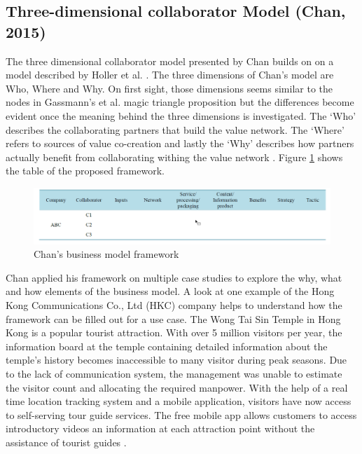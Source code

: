	\subsection{Three-dimensional collaborator Model (Chan, 2015)}

	The three dimensional collaborator model presented by Chan \cite{chan} builds on on a model described by Holler et al. \cite{holler}. The three dimensions of Chan's model are Who, Where and Why. On first sight, those dimensions seems similar to the nodes in Gassmann's et al. magic triangle proposition but the differences become evident once the meaning behind the three dimensions is investigated. The `Who' describes the collaborating partners that build the value network. The `Where' refers to sources of value co-creation and lastly the `Why' describes how partners actually benefit from collaborating withing the value network \cite{chan}. Figure \ref{Chan framework} shows the table of the proposed framework.

			\begin{figure}[ht]
			    \begin{center}
			    \includegraphics[scale=0.5]{Talk11/chan.png}
			    \end{center}
			    \caption{Chan's business model framework}
			    \label{Chan framework}
			\end{figure}

	Chan applied his framework on multiple case studies to explore the why, what and how elements of the business model. A look at one example of the Hong Kong Communications Co., Ltd (HKC) company helps to understand how the framework can be filled out for a use case. The Wong Tai Sin Temple in Hong Kong is a popular tourist attraction. With over 5 million visitors per year, the information board at the temple containing detailed information about the temple's history becomes inaccessible to many visitor during peak seasons. Due to the lack of communication system, the management was unable to estimate the visitor count and allocating the required manpower. With the help of a real time location tracking system and a mobile application, visitors have now access to self-serving tour guide services. The free mobile app allows customers to access introductory videos an information at each attraction point without the assistance of tourist guides \cite[p. 560]{chan}. 


